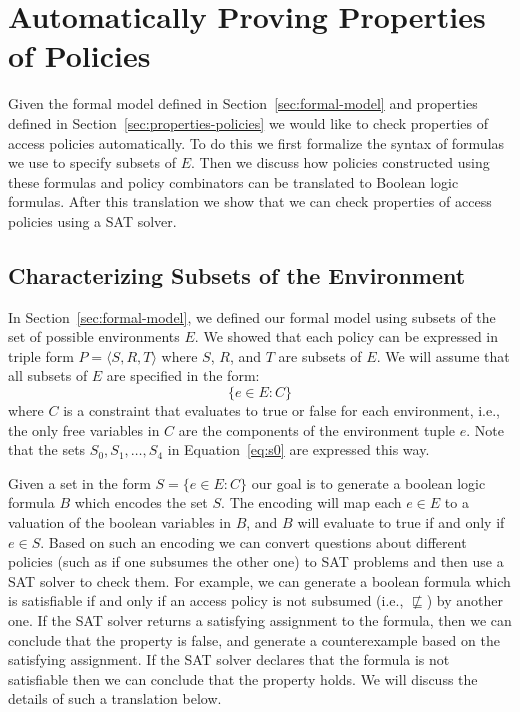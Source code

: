 
\newcommand{\Union}{\bigcup}
\newcommand{\union}{\cup}
\newcommand{\Intersect}{\bigcap}
\newcommand{\intersect}{\cap}
\renewcommand{\And}{\wedge}
\newcommand{\Or}{\vee}
\newcommand{\band}{\bigwedge}
\newcommand{\bor}{\bigvee}
\newcommand{\Implies}{\Rightarrow}
\newcommand{\Iff}{\Leftrightarrow}
\renewcommand{\implies}{\rightarrow}
\renewcommand{\iff}{\leftrightarrow}
\newcommand{\true}{\texttt{true}}
\newcommand{\false}{\texttt{false}}
\newcommand{\assign}{:=}

\section{Automatically Proving Properties of Policies}
\label{sec:autom-prov-prop}

Given the formal model defined in Section~\ref{sec:formal-model} and
properties defined in Section~\ref{sec:properties-policies} we would
like to check properties of access policies automatically.  To do this
we first formalize the syntax of formulas we use to specify subsets of
$E$.  Then we discuss how policies constructed using these formulas
and policy combinators can be translated to Boolean logic formulas.
After this translation we show that we can check properties of access
policies using a SAT solver.

\subsection{Characterizing Subsets of the Environment}
\label{sec:policy-classes}

In Section~\ref{sec:formal-model}, we defined our formal model using
subsets of the set of possible environments $E$.  We showed that each
policy can be expressed in triple form $P= \langle S, R, T \rangle$
where $S$, $R$, and $T$ are subsets of $E$.  We will assume that all
subsets of $E$ are specified in the form:
\[ 
\{ e \in E : C \}
\]
where $C$ is a constraint that evaluates to true or false for each
environment, i.e., the only free variables in $C$ are the components
of the environment tuple $e$.  Note that the sets $S_0, S_1, \dots,
S_4$ in Equation~\eqref{eq:s0} are expressed this way.

Given a set in the form $S = \{ e \in E : C \}$ our goal is to
generate a boolean logic formula $B$ which encodes the set $S$.  The
encoding will map each $e \in E$ to a valuation of the boolean
variables in $B$, and $B$ will evaluate to true if and only if $e \in
S$.  Based on such an encoding we can convert questions about
different policies (such as if one subsumes the other one) to SAT
problems and then use a SAT solver to check them.  For example, we can
generate a boolean formula which is satisfiable if and only if an
access policy is not subsumed (i.e., $\not \sqsubseteq$) by another
one.  If the SAT solver returns a satisfying assignment to the
formula, then we can conclude that the property is false, and generate
a counterexample based on the satisfying assignment.  If the SAT
solver declares that the formula is not satisfiable then we can
conclude that the property holds.  We will discuss the details of such
a translation below.

